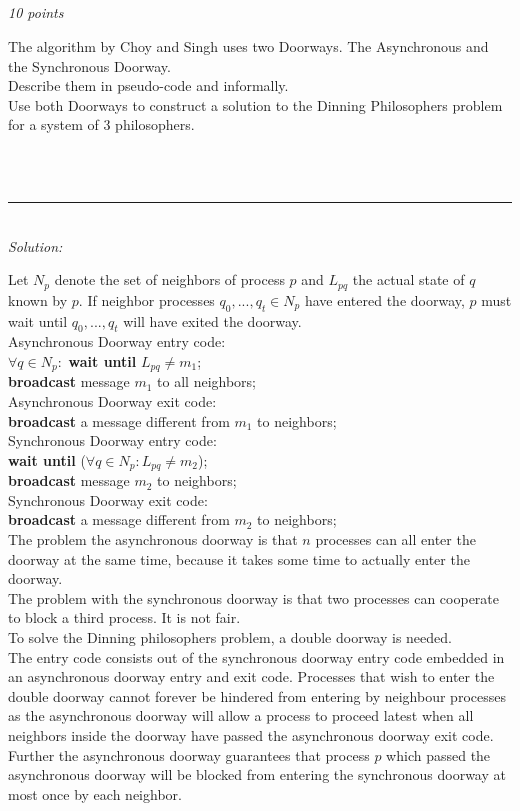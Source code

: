 \documentclass[a4paper]{article}
\newcommand{\horrule}[1]{\rule{\linewidth}{#1}} %
\newcommand{\points}[1]{\subsection{} \textit{#1 points}\\}
\newcommand{\question}[2][]{
  \noindent
  \parbox[t]{\textwidth}{#1 \parbox[t]{0.95\textwidth}{#2}}\\
}
\newcommand{\solution}[1]{\\\horrule{0.5pt}\\[3pt]\textit{Solution: }\\[0.1cm]\begin{minipage}{\textwidth}#1\end{minipage}}
\begin{document}
\points{10}
\question{
  The algorithm by Choy and Singh uses two Doorways. The Asynchronous
  and the Synchronous Doorway. \\ Describe them in pseudo-code and
  informally. \\ Use both Doorways to construct a solution to the
  Dinning Philosophers problem for a system of 3 philosophers.
}
\solution{
  Let $N_p$ denote the set of neighbors of process $p$ and $L_{pq}$
  the actual state of $q$ known by $p$. If neighbor processes
  $q_0,...,q_t \in N_p$ have entered the doorway, $p$ must wait until
  $q_0,...,q_t$ will have exited the doorway.\\[0.1cm]

  Asynchronous Doorway entry code:\\
  $\forall q \in N_p:$ \textbf{wait until} $L_{pq} \neq m_1$;\\
  \textbf{broadcast} message $m_1$ to all neighbors;\\[0.1cm]

  Asynchronous Doorway exit code:\\
  \textbf{broadcast} a message different from $m_1$ to neighbors;\\[0.1cm]

  Synchronous Doorway entry code:\\
  \textbf{wait until} ($\forall q \in N_p: L_{pq} \neq m_2$);\\
  \textbf{broadcast} message $m_2$ to neighbors;\\[0.1cm]

  Synchronous Doorway exit code:\\
  \textbf{broadcast} a message different from $m_2$ to neighbors;\\[0.1cm]

  The problem the asynchronous doorway is that $n$ processes can all
  enter the doorway at the same time, because it takes some time to
  actually enter the doorway.\\[0.1cm]

  The problem with the synchronous doorway is that two processes can
  cooperate to block a third process. It is not fair.\\[0.1cm]

  To solve the Dinning philosophers problem, a double doorway is
  needed.\\
  The entry code consists out of the synchronous doorway entry code
  embedded in an asynchronous doorway entry and exit code. Processes
  that wish to enter the double doorway cannot forever be hindered from
  entering by neighbour processes as the asynchronous doorway will allow
  a process to proceed latest when all neighbors inside the doorway
  have passed the asynchronous doorway exit code. Further the
  asynchronous doorway guarantees that process $p$ which passed the
  asynchronous doorway will be blocked from entering the synchronous
  doorway at most once by each neighbor.

}
\end{document}
